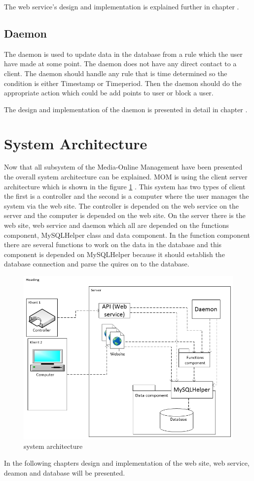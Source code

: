 The web service's design and implementation is explained further in chapter .


\subsection{Daemon}
The daemon is used to update data in the database from a rule which the user have made at some point. The daemon does not have any direct contact to a client. The daemon should handle any rule that is time determined so the condition is either Timestamp or Timeperiod. Then the daemon should do the appropriate action which could be add points to user or block a user.

The design and implementation of the daemon is presented in detail in chapter . 
 
\section{System Architecture}
\label{sec:sysArchitecture}
Now that all subsystem of the Media-Online Management have been presented the overall system architecture can be explained. MOM is using the client server architecture which is shown in the figure \ref{fig:serveroverview} \citep{OOAD}. This system has two types of client the first is a controller and the second is a computer where the user manages the system via the web site. The controller is depended on the web service on the server and the computer is depended on the web site. On the server there is the web site, web service and daemon which all are depended on the functions component, MySQLHelper class and data component. In the function component there are several functions to work on the data in the database and this component is depended on MySQLHelper because it should establish the database connection and parse the quires on to the database. 

\begin{figure}
	\centering
		\includegraphics[width=1.25\textwidth,  angle=90]{images/serveroverview.jpg}
	\caption{system architecture}
	\label{fig:serveroverview}
\end{figure}

In the following chapters design and implementation of the web site, web service, deamon and database will be presented.

 


